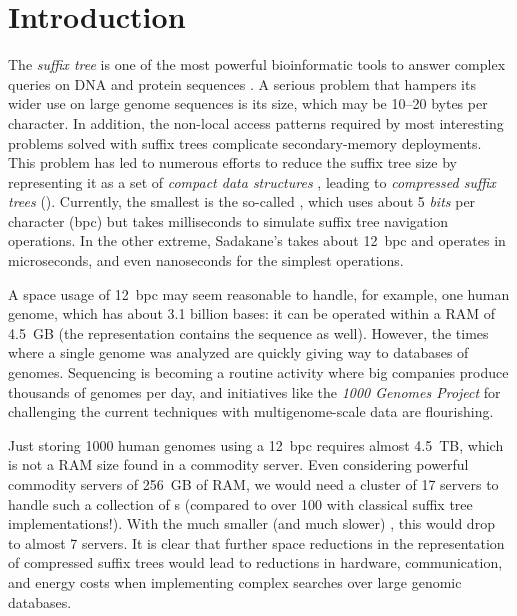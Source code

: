 
\section{Introduction}

The \emph{suffix tree} \cite{Weiner1973} is one of the most powerful bioinformatic tools to
answer complex queries on DNA and protein sequences \cite{Gus97,Ohl13,MBCT15}.
A serious problem that hampers its wider use on large genome sequences is its
size, which may be 10--20 bytes per character. In addition, the non-local
access patterns required by most interesting problems solved with suffix trees
complicate secondary-memory deployments. This problem has led to numerous
efforts to reduce the suffix tree size by representing it as a set of
\emph{compact data structures} \cite{Sadakane2007,Fischer2009a,Ohlebusch2009,Ohlebusch2010,Russo2011,Gog2011a,Abeliuk2013,Navarro2014a}, leading to
\emph{compressed suffix trees} (\CST). Currently, the smallest
\CST{} is the so-called \FCST{} \cite{Russo2011,Navarro2014a}, which uses about
5 \emph{bits} per character (bpc) but takes milliseconds to simulate suffix
tree navigation operations. In the other extreme, Sadakane's \CST{}
\cite{Sadakane2007} takes about 12~bpc and operates in microseconds, and even
nanoseconds for the simplest operations.

A space usage of 12~bpc may seem reasonable to handle, for example, one human
genome, which has about 3.1 billion bases: it can be operated within a
RAM of 4.5~GB (the representation contains the sequence as well). However, the
times where a single genome was analyzed are quickly giving way to databases
of genomes. Sequencing is becoming a routine activity where big companies
produce thousands of genomes per day, and initiatives like the \emph{1000 Genomes
Project} \cite{1000GP} for challenging the current techniques with
multigenome-scale data are flourishing.

Just storing 1000 human genomes using a 12~bpc \CST{} requires almost 4.5~TB, which
is not a RAM size found in a commodity server. Even considering powerful
commodity servers of 256~GB of RAM, we would need a cluster of 17 servers to
handle such a collection of \CST{}s (compared to over 100 with classical suffix
tree implementations!). With the much smaller (and much slower) \FCST, this would
drop to almost 7 servers. It is clear that further space reductions in the
representation of compressed suffix trees would lead to reductions in hardware, communication,
and energy costs when implementing complex searches over large genomic
databases.


